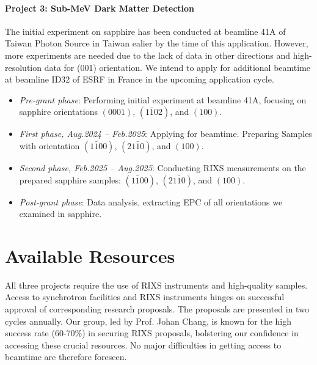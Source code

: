 \documentclass[11pt]{article}
\begin{document}
\paragraph{Project 3: Sub-MeV Dark Matter Detection}
The initial experiment on sapphire has been conducted at beamline 41A of Taiwan Photon Source in Taiwan ealier by the time of this application. However, more experiments are needed due to the lack of data in other directions and high-resolution data for (001) orientation. We intend to apply for additional beamtime at beamline ID32 of ESRF in France in the upcoming application cycle.
\begin{itemize}
  \item \textit{Pre-grant phase}: Performing initial experiment at beamline 41A, focusing on sapphire orientations $(0001)$, $(1\bar{1}02)$, and $(100)$. 
  \item \textit{First phase, Aug.2024 -- Feb.2025}: Applying for beamtime. Preparing Samples with orientation $(1\bar{1}00)$, $(21\bar{1}0)$, and $(100)$. 
  \item \textit{Second phase, Feb.2025 -- Aug.2025}: Conducting RIXS measurements on the prepared sapphire samples: $(1\bar{1}00)$, $(21\bar{1}0)$, and $(100)$. 
  \item \textit{Post-grant phase}: Data analysis, extracting EPC of all orientations we examined in sapphire.
\end{itemize}

\section{Available Resources}
All three projects require the use of RIXS instruments and high-quality samples. Access to synchrotron facilities and RIXS instruments hinges on successful approval of corresponding research proposals. The proposals are presented in two cycles annually. Our group, led by Prof. Johan Chang, is known for the high success rate (60-70\%) in securing RIXS proposals, bolstering our confidence in accessing these crucial resources. No major difficulties in getting access to beamtime are therefore foreseen. 
\end{document}
